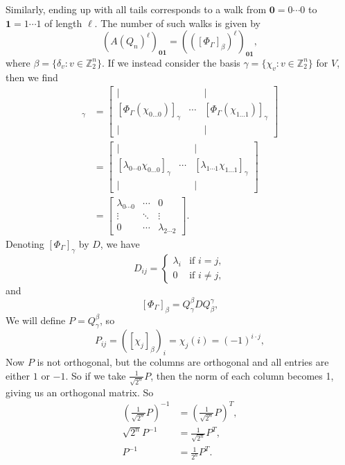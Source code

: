 \documentclass[12pt]{article}
\newcommand{\Z}{\mathbb{Z}}
\newcommand{\ds}{\displaystyle}
\begin{document}
Similarly, ending up with all tails corresponds to a walk from $\textbf{0}=0\cdots0$ to $\textbf{1}=1\cdots1$ of length $\ell$. The number of such walks is given by
\[(A(Q_n)^\ell)_{\textbf{0}\textbf{1}} = (([\Phi_\Gamma]_\beta)^\ell)_{\textbf{0}\textbf{1}},\]
where $\beta=\{\delta_v : v\in\Z_2^n\}$. If we instead consider the basis $\gamma=\{\chi_v : v\in\Z_2^n\}$ for $V$, then we find
\begin{align*}
    [\Phi_\Gamma]_\gamma &=
        \begin{bmatrix}
        | & & | \\
        [\Phi_\Gamma(\chi_{0\dots0})]_\gamma & \cdots & [\Phi_\Gamma(\chi_{1\dots1})]_\gamma \\
        | & & |
    \end{bmatrix} \\
    &=
    \begin{bmatrix}
        | & & | \\
        [\lambda_{0\cdots0}\chi_{0\dots0}]_\gamma & \cdots & [\lambda_{1\cdots1}\chi_{1\dots1}]_\gamma \\
        | & & |
    \end{bmatrix} \\
    &=
    \begin{bmatrix}
        \lambda_{0\cdots0} & \cdots & 0 \\
        \vdots & \ddots & \vdots \\
        0 & \cdots & \lambda_{2\cdots2}
    \end{bmatrix}.
\end{align*}
Denoting $[\Phi_\Gamma]_\gamma$ by $D$, we have
\[ D_{ij} = \begin{cases}
    \lambda_i &\text{if } i=j, \\
    0 &\text{if } i\ne j,
\end{cases}\]
and
\[[\Phi_\Gamma]_\beta = Q_\gamma^\beta D Q_\beta^\gamma,\]
We will define $P=Q_\gamma^\beta$, so
\[P_{ij} = ([\chi_j]_\beta)_i = \chi_j(i) = (-1)^{i\cdot j},\]
Now $P$ is not orthogonal, but the columns are orthogonal and all entries are either $1$ or $-1$. So if we take $\ds\frac1{\sqrt{2^n}}P$, then the norm of each column becomes 1, giving us an orthogonal matrix. So
\begin{align*}
    \left(\ds\frac1{\sqrt{2^n}}P\right)^{-1} &= \left(\ds\frac1{\sqrt{2^n}}P\right)^T, \\
    \sqrt{2^n}P^{-1} &= \ds\frac1{\sqrt{2^n}}P^T, \\
    P^{-1} &= \ds\frac1{2^n}P^T.
\end{align*}
\end{document}
